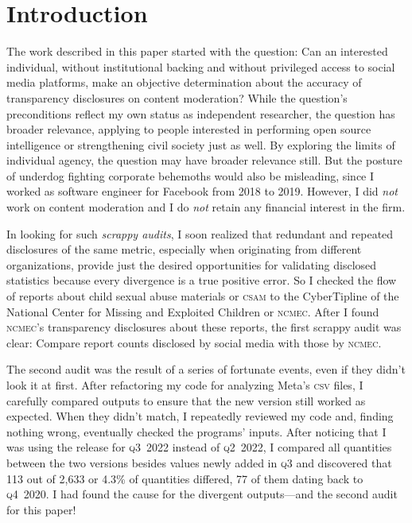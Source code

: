 \documentclass[nonacm,screen]{acmart}
\newcommand\V[1]{\textsc{\MakeLowercase{#1}}}
\begin{document}

\section{Introduction}
\label{sec:introduction}

The work described in this paper started with the question: Can an interested
individual, without institutional backing and without privileged access to
social media platforms, make an objective determination about the accuracy of
transparency disclosures on content moderation? While the question's
preconditions reflect my own status as independent researcher, the question has
broader relevance, applying to people interested in performing open source
intelligence or strengthening civil society just as well. By exploring the
limits of individual agency, the question may have broader relevance still. But
the posture of underdog fighting corporate behemoths would also be misleading,
since I worked as software engineer for Facebook from 2018 to 2019. However, I
did \emph{not} work on content moderation and I do \emph{not} retain any
financial interest in the firm.

In looking for such \emph{scrappy audits}, I soon realized that redundant and
repeated disclosures of the same metric, especially when originating from
different organizations, provide just the desired opportunities for validating
disclosed statistics because every divergence is a true positive error. So I
checked the flow of reports about child sexual abuse materials or \V{CSAM} to
the CyberTipline of the National Center for Missing and Exploited Children or
\V{NCMEC}. After I found \V{NCMEC}'s transparency disclosures about these
reports, the first scrappy audit was clear: Compare report counts disclosed by
social media with those by \V{NCMEC}.

The second audit was the result of a series of fortunate events, even if they
didn't look it at first. After refactoring my code for analyzing Meta's \V{CSV}
files, I carefully compared outputs to ensure that the new version still worked
as expected. When they didn't match, I repeatedly reviewed my code and, finding
nothing wrong, eventually checked the programs' inputs. After noticing that I
was using the release for \V{Q3}~2022 instead of \V{Q2}~2022, I compared all
quantities between the two versions besides values newly added in \V{Q3} and
discovered that 113 out of 2,633 or 4.3\% of quantities differed, 77 of them
dating back to \V{Q4}~2020. I had found the cause for the divergent
outputs---and the second audit for this paper!
\end{document}
